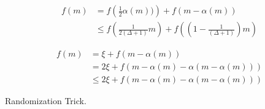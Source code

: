 \documentclass{article}
\begin{document}
\begin{multicols*}{2}
\begin{equation*}
    \begin{split}
        f\left(m\right) &= f\left( \frac{1}{2}\alpha\left(m\right))  \right) + f\left( m - \alpha\left(m\right) \right)  \\
        & \le f\left( \frac{1}{2\left(\Delta+1\right)}m\right) + f\left( \left(1 - \frac{1}{\left( \Delta + 1 \right)} \right)m \right) 
    \end{split}
\end{equation*}

\begin{equation*}
    \begin{split}
        f\left(m\right) &= \xi + f\left( m - \alpha\left(m\right) \right)  \\
        & = 2\xi + f\left( m - \alpha\left(m\right) - \alpha\left(m - \alpha\left(m\right)\right)  \right) \\ & \le 2\xi + f\left( m - \alpha\left(m\right) - \alpha\left(m - \alpha\left(m\right)\right)  \right)
    \end{split}
\end{equation*}

Randomization Trick.




\end{multicols*}
\end{document}
